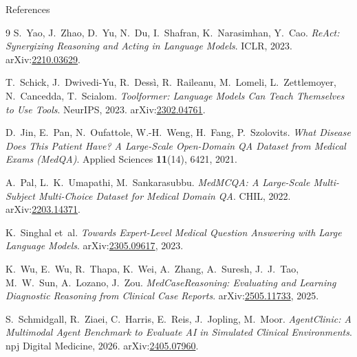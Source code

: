 \documentclass[aspectratio=169,t]{beamer}
\begin{document}
\begin{frame}[allowframebreaks]{References}
  \scriptsize
  \begin{thebibliography}{9}
      S.~Yao, J.~Zhao, D.~Yu, N.~Du, I.~Shafran, K.~Narasimhan, Y.~Cao.
      \newblock \emph{ReAct: Synergizing Reasoning and Acting in
                     Language Models}.
      \newblock ICLR, 2023.
      \newblock arXiv:\href{https://arxiv.org/abs/2210.03629}{2210.03629}.

      T.~Schick, J.~Dwivedi-Yu, R.~Dess\`i, R.~Raileanu, M.~Lomeli,
      L.~Zettlemoyer, N.~Cancedda, T.~Scialom.
      \newblock \emph{Toolformer: Language Models Can Teach Themselves
                     to Use Tools}.
      \newblock NeurIPS, 2023.
      \newblock arXiv:\href{https://arxiv.org/abs/2302.04761}{2302.04761}.

      D.~Jin, E.~Pan, N.~Oufattole, W.-H.~Weng, H.~Fang, P.~Szolovits.
      \newblock \emph{What Disease Does This Patient Have? A Large-Scale
                     Open-Domain QA Dataset from Medical Exams (MedQA)}.
      \newblock Applied Sciences \textbf{11}(14), 6421, 2021.

      A.~Pal, L.~K.~Umapathi, M.~Sankarasubbu.
      \newblock \emph{MedMCQA: A Large-Scale Multi-Subject Multi-Choice
                     Dataset for Medical Domain QA}.
      \newblock CHIL, 2022.
      \newblock arXiv:\href{https://arxiv.org/abs/2203.14371}{2203.14371}.

      K.~Singhal et~al.
      \newblock \emph{Towards Expert-Level Medical Question Answering
                     with Large Language Models}.
      \newblock arXiv:\href{https://arxiv.org/abs/2305.09617}{2305.09617}, 2023.

      K.~Wu, E.~Wu, R.~Thapa, K.~Wei, A.~Zhang, A.~Suresh, J.~J.~Tao,
      M.~W.~Sun, A.~Lozano, J.~Zou.
      \newblock \emph{MedCaseReasoning: Evaluating and Learning
                     Diagnostic Reasoning from Clinical Case Reports}.
      \newblock arXiv:\href{https://arxiv.org/abs/2505.11733}{2505.11733}, 2025.

      S.~Schmidgall, R.~Ziaei, C.~Harris, E.~Reis, J.~Jopling, M.~Moor.
      \newblock \emph{AgentClinic: A Multimodal Agent Benchmark to
                     Evaluate AI in Simulated Clinical Environments}.
      \newblock npj Digital Medicine, 2026.
      \newblock arXiv:\href{https://arxiv.org/abs/2405.07960}{2405.07960}.


\end{thebibliography}
\end{frame}
\end{document}

